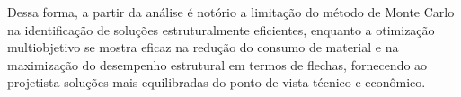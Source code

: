 



Dessa forma, a partir da análise é notório a limitação do método de Monte Carlo na identificação de soluções estruturalmente eficientes, enquanto a otimização multiobjetivo se mostra eficaz na redução do consumo de material e na maximização do desempenho estrutural em termos de flechas, fornecendo ao projetista soluções mais equilibradas do ponto de vista técnico e econômico.

